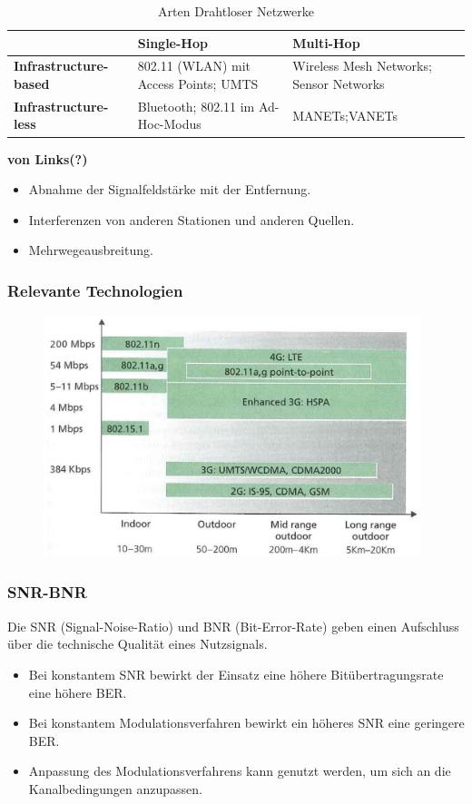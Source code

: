 \documentclass{article} %
\begin{document}
	\begin{table}[h]
		\centering
		\label{tab:mobile_characteristics}
		\begin{tabular}{|l|l|l|}
			\hline
			& \textbf{Single-Hop}                   & \textbf{Multi-Hop}                      \\ \hline
			\textbf{Infrastructure-based} & 802.11 (WLAN) mit Access Points; UMTS & Wireless Mesh Networks; Sensor Networks \\ \hline
			\textbf{Infrastructure-less}  & Bluetooth; 802.11 im Ad-Hoc-Modus     & MANETs;VANETs                             \\ \hline
		\end{tabular}
		\caption{Arten Drahtloser Netzwerke}
	\end{table}
	
\textbf{von Links(?)}
	\begin{itemize}
	\item Abnahme der Signalfeldstärke mit der Entfernung. 
	\item Interferenzen von anderen Stationen und anderen Quellen. 
	\item Mehrwegeausbreitung. 
	\end{itemize}
	
\subsubsection{Relevante Technologien}

	\begin{figure}[h]
	\centering
	\includegraphics[width=11cm]{img/mobilTech.png}
	\end{figure}	
\subsubsection{SNR-BNR}
Die SNR (Signal-Noise-Ratio) und BNR (Bit-Error-Rate) geben einen Aufschluss über die technische Qualität eines Nutzsignals.
	\begin{itemize}
	\item Bei konstantem SNR bewirkt der Einsatz eine höhere Bitübertragungsrate eine höhere BER. 
	\item Bei konstantem Modulationsverfahren bewirkt ein höheres SNR eine geringere BER. 
	\item Anpassung des Modulationsverfahrens kann genutzt werden, um sich an die Kanalbedingungen anzupassen. 
	\end{itemize}
\end{document}

